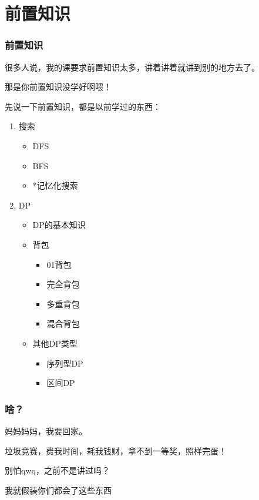 \documentclass[UTF-8,aspectratio=1610]{ctexbeamer}
\begin{document}
\section{前置知识}
\begin{frame}
\frametitle{前置知识}
很多人说，我的课要求前置知识太多，讲着讲着就讲到别的地方去了。\pause

那是你前置知识没学好啊喂！\pause

先说一下前置知识，都是以前学过的东西：\pause
\begin{enumerate}[<+->]
\item{搜索}
\begin{itemize}
\item{DFS}
\item{BFS}
\item{*记忆化搜索}
\end{itemize}
\item{DP}
\begin{itemize}
\item{DP的基本知识}
\item{背包}
\begin{itemize}
\item{01背包}
\item{完全背包}
\item{多重背包}
\item{混合背包}
\end{itemize}
\item{其他DP类型}
\begin{itemize}
\item{序列型DP}
\item{区间DP}
\end{itemize}
\end{itemize}
\end{enumerate}
\end{frame}
\begin{frame}
\frametitle{啥？}
妈妈妈妈，我要回家。\pause

垃圾竞赛，费我时间，耗我钱财，拿不到一等奖，照样完蛋！\pause

别怕qwq，之前不是讲过吗？\pause

我就假装你们都会了这些东西
\end{frame}
\end{document}
